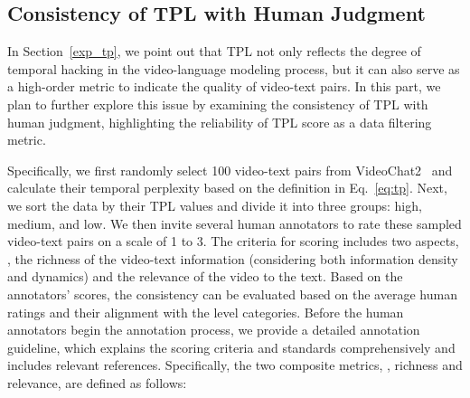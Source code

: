 \subsection{Consistency of TPL with Human Judgment}
\label{add_tpl}

\begin{table}[h]
    \caption{\textbf{Consistency between TPL score and human judgment}.}
    \vspace{-1em}
    \label{tab:tpl_consis}
    \begin{center}        
    \end{center}
        \vspace{-2em}
\end{table}

In Section~\ref{exp_tp}, we point out that TPL not only reflects the degree of temporal hacking in the video-language modeling process, but it can also serve as a high-order metric to indicate the quality of video-text pairs. In this part, we plan to further explore this issue by examining the consistency of TPL with human judgment, highlighting the reliability of TPL score as a data filtering metric.

Specifically, we first randomly select 100 video-text pairs from VideoChat2~\citep{li2023videochat} and calculate their temporal perplexity based on the definition in Eq.~\ref{eq:tp}. Next, we sort the data by their TPL values and divide it into three groups: high, medium, and low. We then invite several human annotators to rate these sampled video-text pairs on a scale of 1 to 3. The criteria for scoring includes two aspects, \ie, the richness of the video-text information (considering both information density and dynamics) and the relevance of the video to the text. Based on the annotators’ scores, the consistency can be evaluated based on the average human ratings and their alignment with the level categories. Before the human annotators begin the annotation process, we provide a detailed annotation guideline, which explains the scoring criteria and standards comprehensively and includes relevant references. Specifically, the two composite metrics, \ie, richness and relevance, are defined as follows:


